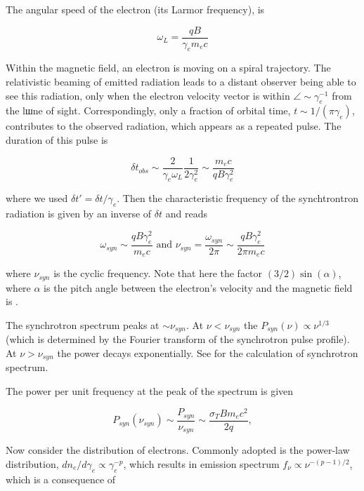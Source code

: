 The angular speed of the electron (\eg its Larmor frequency), is

\begin{equation}
\omega_L = \frac{q B}{\gamma_e m_e c}
\end{equation}

Within the magnetic field, an electron is moving on a spiral trajectory. 
The relativistic beaming of emitted radiation leads to a distant observer being able to see this radiation, only when the electron velocity vector is within $\angle \sim \gamma_e^{-1}$ from the lшne of sight. Correspondingly, only a fraction of orbital time, $t\sim1/(\pi\gamma_e)$, contributes to the observed radiation, which appears as a repeated pulse. 
The duration of this pulse is

\begin{equation}
\delta t_{obs} \sim \frac{2}{\gamma_e \omega_L}\frac{1}{2\gamma_e^2}\sim \frac{m_e c}{q B \gamma_e^2}
\end{equation}

where we used $\delta t' = \delta t / \gamma_e$. 
Then the characteristic frequency of the synchtrontron radiation is given by an inverse of $\delta t$ and reads 

\begin{equation}
\omega_{syn} \sim \frac{q B \gamma_e^2}{m_e c} \text{ and } \nu_{syn} = \frac{\omega_{syn}}{2\pi} \sim \frac{q B \gamma_e^2}{2\pi m_e c}
\end{equation}

where $\nu_{syn}$ is the cyclic frequency.
Note that here the factor $(3/2)\sin(\alpha)$, where $\alpha$ is the pitch angle between the electron's velocity and the magnetic field is .

The synchrotron spectrum peaks at $\sim \nu_{syn}$. At $\nu < \nu_{syn}$ the $P_{syn}(\nu)\propto\nu^{1/3}$ (which is determined by the Fourier transform of the synchrotron pulse profile). At $\nu > \nu_{syn}$ the power decays exponentially. See \citet{RybickiLightman:1985} for the calculation of synchrotron spectrum.

The power per unit frequency at the peak of the spectrum is given 

\begin{equation}
P_{syn}(\nu_{syn}) \sim \frac{P_{syn}}{\nu_{syn}} \sim \frac{\sigma_T B m_e c^2}{2 q},
\end{equation}

Now consider the distribution of electrons.
Commonly adopted is the power-law distribution, $dn_e/d\gamma_e \propto \gamma_e^{-p}$, which results in emission spectrum $f_{\nu}\propto\nu^{-(p-1)/2}$,
which is a consequence of 


